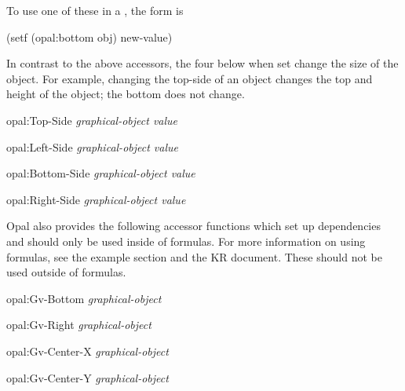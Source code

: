 \begin{group}
To use one of these in a , the form is
\begin{programexample}
(setf (opal:bottom obj) new-value)
\end{programexample}
\end{group}

\begin{group}
In contrast to the above accessors, the four below when set change the
size of the object.  For example, changing the top-side of an object
changes the top and height of the object; the bottom does not change.

 
\begin{programexample}
opal:Top-Side {\it graphical-object value}\value{macro}

opal:Left-Side {\it graphical-object value}\value{macro}

opal:Bottom-Side {\it graphical-object value}\value{macro}

opal:Right-Side {\it graphical-object value}\value{macro}
\end{programexample}
\end{group}

\begin{group}
Opal also provides the following accessor functions which set up
dependencies and should only be used inside of formulas.  For more
information on using formulas, see the example section and the KR document.
These should not be used outside of formulas.

   
\begin{programexample}
opal:Gv-Bottom {\it graphical-object}\value{function}

opal:Gv-Right {\it graphical-object}\value{function}

opal:Gv-Center-X {\it graphical-object}\value{function}

opal:Gv-Center-Y {\it graphical-object}\value{function}
\end{programexample}
\end{group}

